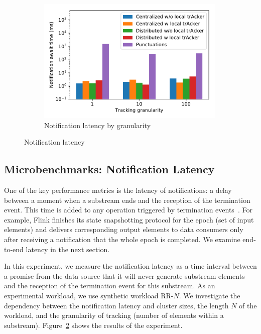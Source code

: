 \begin{figure}[t!]
    \begin{subfigure}[b]{0.3\textwidth}
            \includegraphics[width=0.99\textwidth]{Chapters/Tracker/pics/notification_await_time_by_tracking_frequency_bars.pdf}
            \caption{Notification latency by granularity}
            \label{notification_granularity}
    \end{subfigure}
    \caption{Notification latency}
    \label{notification_latency}
\end{figure}

\subsection{Microbenchmarks: Notification Latency}
\label{absolute-latency}

One of the key performance metrics is the latency of notifications: a delay between a moment when a substream ends and the reception of the termination event. This time is added to any operation triggered by termination events~\cite{Carbone:2017:SMA:3137765.3137777, we2018adbis}. For example, Flink finishes its state snapshotting protocol for the epoch (set of input elements) and delivers corresponding output elements to data consumers only after receiving a notification that the whole epoch is completed. We examine end-to-end latency in the next section.

In this experiment, we measure the notification latency as a time interval between a promise from the data source that it will never generate substream elements and the reception of the termination event for this substream. As an experimental workload, we use synthetic workload RR-$N$. We investigate the dependency between the notification latency and cluster sizes, the length $N$ of the workload, and the granularity of tracking (number of elements within a substream). Figure~\ref{notification_latency} shows the results of the experiment. 

